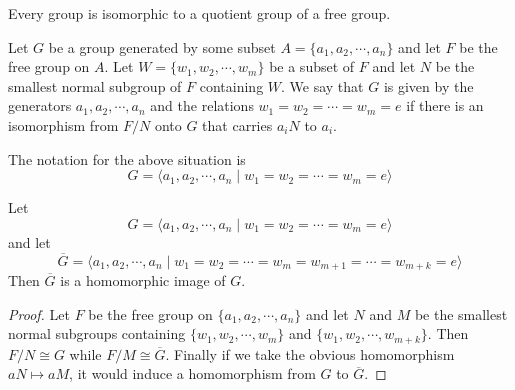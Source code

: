 \begin{corollary}
	Every group is isomorphic to a quotient group of a free group.
\end{corollary}

\begin{definition}
	Let $G$ be a group generated by some subset $A=\{a_1,a_2,\cdots,a_n\}$ and let $F$ be the free group on $A$. Let $W=\{w_1,w_2,\cdots,w_m\}$ be a subset of $F$ and let $N$ be the smallest normal subgroup of $F$ containing $W$. We say that $G$ is given by the generators $a_1,a_2,\cdots,a_n$ and the relations $w_1=w_2=\cdots=w_m=e$ if there is an isomorphism from $F/N$ onto $G$ that carries $a_iN$ to $a_i$.
\end{definition}

The notation for the above situation is 
\begin{equation*}
	G = \langle a_1,a_2,\cdots,a_n \mid w_1=w_2=\cdots=w_m=e\rangle
\end{equation*}

\begin{theorem}[Dyck, 1882]
	Let 
	\begin{equation*}
		G = \langle a_1,a_2,\cdots,a_n \mid w_1=w_2=\cdots=w_m=e \rangle
	\end{equation*}
	and let 
	\begin{equation*}
		\overline{G} = \langle a_1,a_2,\cdots,a_n \mid w_1=w_2=\cdots=w_m=w_{m+1}=\cdots=w_{m+k} = e\rangle
	\end{equation*}
	Then $\overline{G}$ is a homomorphic image of $G$.
\end{theorem}
\begin{proof}
	Let $F$ be the free group on $\{a_1,a_2,\cdots,a_n\}$ and let $N$ and $M$ be the smallest normal subgroups containing $\{w_1,w_2,\cdots,w_m\}$ and $\{w_1,w_2,\cdots,w_{m+k}\}$. Then $F/N\cong G$ while $F/M\cong\overline{G}$. Finally if we take the obvious homomorphism $aN\mapsto aM$, it would induce a homomorphism from $G$ to $\overline{G}$.
\end{proof}

